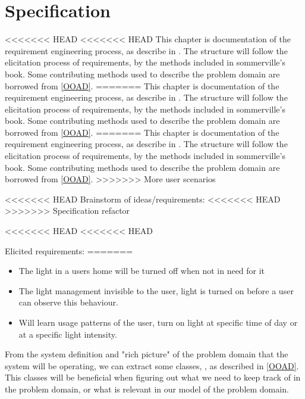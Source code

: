 \chapter{Specification}

<<<<<<< HEAD
<<<<<<< HEAD
This chapter is documentation of the requirement engineering process, as describe in \cite{sommerville}. The structure will follow the elicitation process of requirements, by the methods included in sommerville's book. Some contributing methods used to describe the problem domain are borrowed from \cref{OOAD}. 
=======
This chapter is documentation of the requirement engineering process, as describe in \citep{sommerville}. The structure will follow the elicitation process of requirements, by the methods included in sommerville's book. Some contributing methods used to describe the problem domain are borrowed from \cref{OOAD}. 
=======
This chapter is documentation of the requirement engineering process, as describe in \cite{sommerville}. The structure will follow the elicitation process of requirements, by the methods included in sommerville's book. Some contributing methods used to describe the problem domain are borrowed from \cref{OOAD}. 
>>>>>>> More user scenarios

<<<<<<< HEAD
Brainstorm of ideas/requirements:
<<<<<<< HEAD
>>>>>>> Specification refactor







<<<<<<< HEAD
<<<<<<< HEAD





Elicited requirements: %
=======
\begin{itemize}
\item The light in a users home will be turned off when not in need for it
\item The light management invisible to the user, light is turned on before a user can observe this behaviour.
\item Will learn usage patterns of the user, turn on light at specific time of day or at a specific light intensity.
\end{itemize}

From the system definition and "rich picture" of the problem domain that the system will be operating, we can extract some classes, , as described in \cref{OOAD}. This classes will be beneficial when figuring out what we need to keep track of in the problem domain, or what is relevant in our model of the problem domain.

